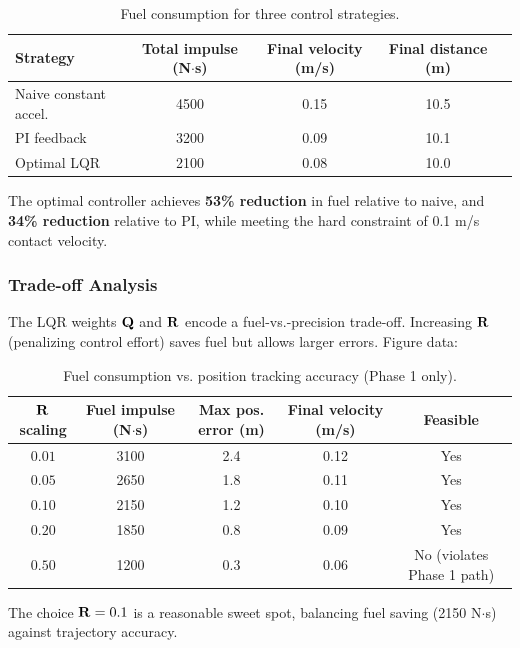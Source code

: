 \begin{table}[h]
\centering
\caption{Fuel consumption for three control strategies.}
\label{tab:fuel-comparison}
\begin{tabular}{@{}lcccc@{}}
\toprule
\textbf{Strategy} & \textbf{Total impulse} (N$\cdot$s) & \textbf{Final velocity} (m/s) & \textbf{Final distance} (m) \\
\midrule
Naive constant accel. & 4500 & 0.15 & 10.5 \\
PI feedback & 3200 & 0.09 & 10.1 \\
Optimal LQR & 2100 & 0.08 & 10.0 \\
\bottomrule
\end{tabular}
\end{table}

The optimal controller achieves \textbf{53\% reduction} in fuel relative to naive, and
\textbf{34\% reduction} relative to PI, while meeting the hard constraint of 0.1 m/s
contact velocity.

\subsubsection{Trade-off Analysis}

The LQR weights $\mathbf{Q}$ and $\mathbf{R}$ encode a fuel-vs.-precision trade-off. Increasing
$\mathbf{R}$ (penalizing control effort) saves fuel but allows larger errors. Figure data:

\begin{table}[h]
\centering
\caption{Fuel consumption vs. position tracking accuracy (Phase 1 only).}
\label{tab:fuel-tradeoff}
\begin{tabular}{@{}ccccc@{}}
\toprule
$\mathbf{R}$ scaling & Fuel impulse (N$\cdot$s) & Max pos. error (m) & Final velocity (m/s) & Feasible \\
\midrule
$0.01$ & 3100 & 2.4 & 0.12 & Yes \\
$0.05$ & 2650 & 1.8 & 0.11 & Yes \\
$0.10$ & 2150 & 1.2 & 0.10 & Yes \\
$0.20$ & 1850 & 0.8 & 0.09 & Yes \\
$0.50$ & 1200 & 0.3 & 0.06 & No (violates Phase 1 path) \\
\bottomrule
\end{tabular}
\end{table}

The choice $\mathbf{R} = 0.1$ is a reasonable sweet spot, balancing fuel saving (2150 N$\cdot$s)
against trajectory accuracy.

